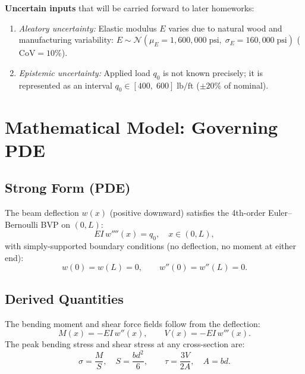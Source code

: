\documentclass[11pt,letterpaper]{article}
\newcommand{\EI}{EI}
\begin{document}
\textbf{Uncertain inputs} that will be carried forward to later homeworks:
\begin{enumerate}[nosep]
  \item \textit{Aleatory uncertainty:} Elastic modulus $E$ varies due to natural wood
        and manufacturing variability:
        $E \sim \mathcal{N}(\mu_E = 1{,}600{,}000\;\text{psi},\;\sigma_E =
        160{,}000\;\text{psi})$ ($\mathrm{CoV} = 10\%$).
  \item \textit{Epistemic uncertainty:} Applied load $q_0$ is not known precisely;
        it is represented as an interval
        $q_0 \in [400,\; 600]\;\text{lb/ft}$ ($\pm 20\%$ of nominal).
\end{enumerate}

\section{Mathematical Model: Governing PDE}
\label{sec:pde}

\subsection{Strong Form (PDE)}

The beam deflection $w(x)$ (positive downward) satisfies the 4th-order
Euler--Bernoulli BVP on $(0,L)$:
\begin{equation}
  \EI\,w''''(x) = q_0, \quad x \in (0, L),
  \label{eq:bvp}
\end{equation}
with simply-supported boundary conditions (no deflection, no moment at either end):
\begin{equation}
  w(0) = w(L) = 0, \qquad w''(0) = w''(L) = 0.
  \label{eq:bcs}
\end{equation}

\subsection{Derived Quantities}

The bending moment and shear force fields follow from the deflection:
\begin{equation}
  M(x) = -\EI\, w''(x), \qquad V(x) = -\EI\, w'''(x).
\end{equation}
The peak bending stress and shear stress at any cross-section are:
\begin{equation}
  \sigma = \frac{M}{S}, \quad S = \frac{bd^2}{6},
  \qquad
  \tau = \frac{3V}{2A}, \quad A = bd.
\end{equation}
\end{document}
